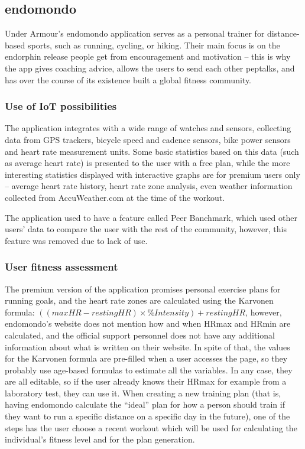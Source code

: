 \subsection{endomondo}

Under Armour's endomondo application serves as a personal trainer for distance-based sports, such as running, cycling, or hiking.
Their main focus is on the endorphin release people get from encouragement and motivation -- this is why the app gives coaching advice, allows the users to send each other peptalks, and has over the course of its existence built a global fitness community.
\subsubsection*{Use of IoT possibilities}
The application integrates with a wide range of watches and sensors, collecting data from GPS trackers, bicycle speed and cadence sensors, bike power sensors and heart rate measurement units.
Some basic statistics based on this data (such as average heart rate) is presented to the user with a free plan, 
while the more interesting statistics displayed with interactive graphs are for premium users only -- average heart rate history, heart rate zone analysis, even weather information collected from AccuWeather.com at the time of the workout.

The application used to have a feature called Peer Banchmark, which used other users' data to compare the user with the rest of the community, however, this feature was removed due to lack of use.\cite{endomondo-HR-max-emails}
\subsubsection*{User fitness assessment}
The premium version of the application promises personal exercise plans for running goals, and the heart rate zones are calculated using the Karvonen formula: $((max HR − resting HR) × \% Intensity) + resting HR$,
however, endomondo's website does not mention how and when HRmax and HRmin are calculated, and the official support personnel does not have any additional information about what is written on their website.\cite{endomondo-HR-max-emails}
In spite of that, the values for the Karvonen formula are pre-filled when a user accesses the page, so they probably use age-based formulas to estimate all the variables.
In any case, they are all editable, so if the user already knows their HRmax for example from a laboratory test, they can use it.
When creating a new training plan (that is, having endomondo calculate the ``ideal'' plan for how a person should train if they want to run a specific distance on a specific day in the future),
one of the steps has the user choose a recent workout which will be used for calculating the individual's fitness level and for the plan generation.\cite{endomondo-training-plan-fitness-assessment}

